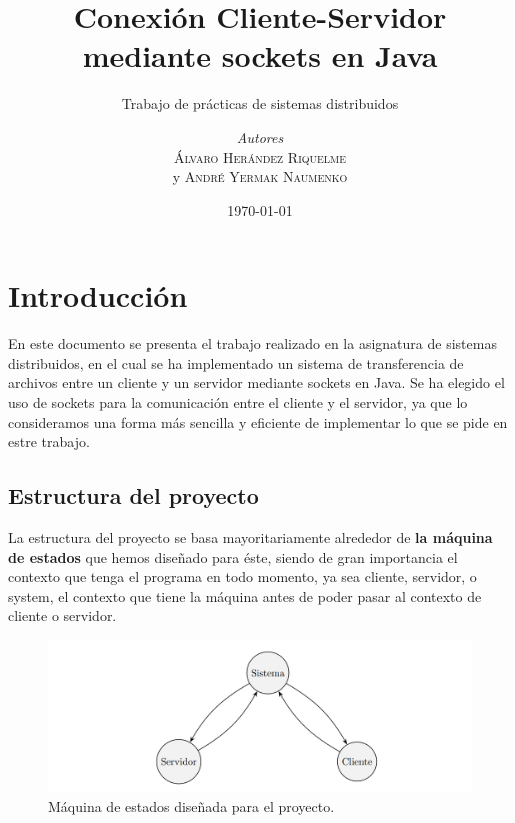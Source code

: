 \documentclass[a4paper, 12pt]{report}
\institute{Universidad Politécnica de Cartagena}
\title{Conexión Cliente-Servidor mediante sockets en Java}
\subtitle{Trabajo de prácticas de sistemas distribuidos }
\author{\textit{Autores}\\\textsc{Álvaro Herández Riquelme}\\ y \textsc{André Yermak Naumenko}}
\date{\today}
\begin{document}
    \maketitle
    \romantableofcontents

\newpage

    \chapter{Introducción}

    En este documento se presenta el trabajo realizado en la asignatura de sistemas distribuidos, en el cual se ha
    implementado un sistema de transferencia de archivos entre un cliente y un servidor mediante sockets en Java.
    Se ha elegido el uso de sockets para la comunicación entre el cliente y el servidor, ya que lo consideramos una
    forma más sencilla y eficiente de implementar lo que se pide en estre trabajo.

    \section{Estructura del proyecto}

    La estructura del proyecto se basa mayoritariamente alrededor de \textbf{la máquina de estados} que hemos
    diseñado para éste, siendo de gran importancia el contexto que tenga el programa en todo momento, ya sea
    cliente, servidor, o system, el contexto que tiene la máquina antes de poder pasar al contexto de cliente o
    servidor.
%


    \begin{figure}[H]
        \centering
        \includegraphics[scale=0.20]{resources/img/diagrama.png}
        \caption{Máquina de estados diseñada para el proyecto.}
        \label{fig:main}
    \end{figure}
\end{document}
